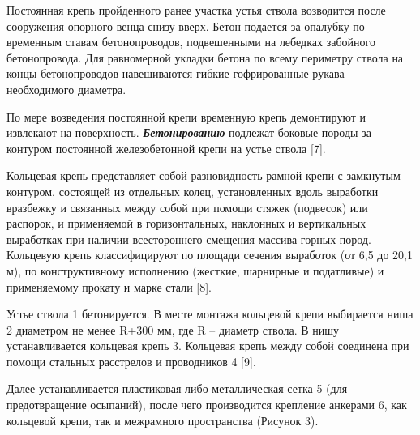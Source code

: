 Постоянная крепь пройденного ранее участка устья ствола возводится после
сооружения опорного венца снизу-вверх. Бетон подается за опалубку по
временным ставам бетонопроводов, подвешенными на лебедках забойного
бетонопровода. Для равномерной укладки бетона по всему периметру ствола
на концы бетонопроводов навешиваются гибкие гофрированные рукава
необходимого диаметра.

По мере возведения постоянной крепи временную крепь демонтируют и
извлекают на поверхность. \emph{{\bfseries Бетонированию}} подлежат боковые
породы за контуром постоянной железобетонной крепи на устье ствола
{[}7{]}.

Кольцевая крепь представляет собой разновидность рамной крепи с
замкнутым контуром, состоящей из отдельных колец, установленных вдоль
выработки вразбежку и связанных между собой при помощи стяжек (подвесок)
или распорок, и применяемой в горизонтальных, наклонных и вертикальных
выработках при наличии всестороннего смещения массива горных пород.
Кольцевую крепь классифицируют по площади сечения выработок (от 6,5 до
20,1 м), по конструктивному исполнению (жесткие, шарнирные и податливые)
и применяемому прокату и марке стали {[}8{]}.

Устье ствола 1 бетонируется. В месте монтажа кольцевой крепи выбирается
ниша 2 диаметром не менее R+300 мм, где R -- диаметр ствола. В нишу
устанавливается кольцевая крепь 3. Кольцевая крепь между собой соединена
при помощи стальных расстрелов и проводников 4 {[}9{]}.

Далее устанавливается пластиковая либо металлическая сетка 5 (для
предотвращение осыпаний), после чего производится крепление анкерами 6,
как кольцевой крепи, так и межрамного пространства (Рисунок 3).

